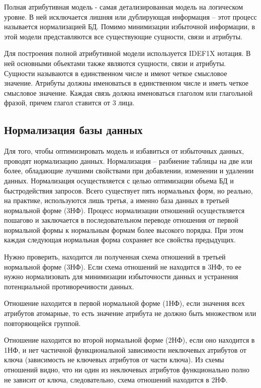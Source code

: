 Полная атрибутивная модель - самая детализированная модель на логическом уровне. В ней исключается лишняя или дублирующая информация – этот процесс называется нормализацией БД. Помимо минимизации избыточной информации, в этой модели представляются все существующие сущности, связи и атрибуты.

Для построения полной атрибутивной модели используется IDEF1X нотация. В ней основными объектами также являются сущности, связи и атрибуты. Сущности называются в единственном числе и имеют четкое смысловое значение. Атрибуты должны именоваться в единственном числе и иметь четкое смысловое значение. Каждая связь должна именоваться глаголом или глагольной фразой, причем глагол ставится от 3 лица.

\subsection{Нормализация базы данных}

Для того, чтобы оптимизировать модель и избавиться от избыточных данных, проводят нормализацию данных. Нормализация – разбиение таблицы на две или более, обладающие лучшими свойствами при добавлении, изменении и удалении данных. Нормализация осуществляется с целью оптимизации объема БД и быстродействия запросов. Всего существует пять нормальных форм, но реально, на практике, используются лишь третья, а именно база данных в третьей нормальной форме (3НФ). Процесс нормализации отношений осуществляется пошагово и заключается в последовательном переводе отношения от первой нормальной формы к нормальным формам более высокого порядка. При этом каждая следующая нормальная форма сохраняет все свойства предыдущих.

Нужно проверить, находится ли полученная схема отношений в третьей нормальной форме (3НФ). Если схема отношений не находится в 3НФ, то ее нужно нормализовать для минимизации избыточности данных и устранения потенциальной противоречивости данных.

Отношение находится в первой нормальной форме (1НФ), если значения всех атрибутов атомарные, то есть значение атрибута не должно быть множеством или повторяющейся группой.

Отношение находится во второй нормальной форме (2НФ), если оно находится в 1НФ, и нет частичной функциональной зависимости неключевых атрибутов от ключа (зависимость не ключевых атрибутов от части ключа). Из схемы отношений видно, что ни один из неключевых атрибутов функционально полно не зависит от ключа, следовательно, схема отношений находится в 2НФ.

